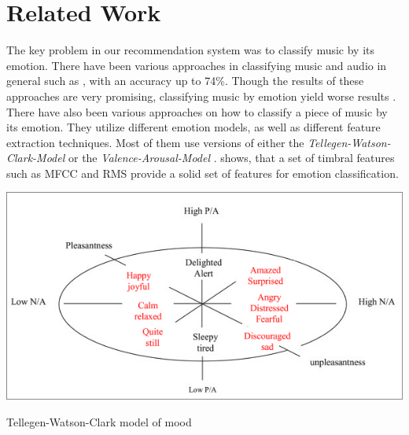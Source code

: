 \documentclass{sigchi-ext}
\begin{document}
\section{Related Work}
The key problem in our recommendation system was to classify music by its emotion. There have been various approaches in classifying music and audio in general such as \cite{Mckinney2003,Cook2007,Jeremic2015,Tzanetakis2002}, with an accuracy up to 74\%. Though the results of these approaches are very promising, classifying music by emotion yield worse results \cite{Kim2010}. There have also been various approaches on how to classify a piece of music by its emotion. They utilize different emotion models, as well as different feature extraction techniques. Most of them use versions of either the \textit{Tellegen-Watson-Clark-Model} \cite{Trohidis2011} or the \textit{Valence-Arousal-Model} \cite{Kim2011}. \cite{Kim2010} shows, that a set of timbral features such as MFCC and RMS provide a solid set of features for emotion classification.

\begin{marginfigure}[0pc]
  \begin{minipage}{\marginparwidth}
    \centering
    \includegraphics[width=1.0\marginparwidth]{images/tellegen-watson-clark-model.png}
    \caption{Tellegen-Watson-Clark model of mood \cite{Tellegen1999}}~\label{fig:tellegen-watson-clark}
  \end{minipage}
\end{marginfigure}
\end{document}
